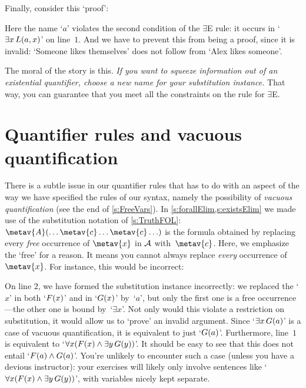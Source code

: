 Finally, consider this `proof':
\begin{fitchproof}
	\PR
	\open
		\AS
	\close
\ifHTMLtarget
\else
\fi
\end{fitchproof}
Here the name `$a$' violates the second condition of the $\exists$E
rule: it occurs in `$\exists x\, L(a, x)$' on line~$1$. And we
have to prevent this from being a proof, since it is invalid: `Someone
likes themselves' does not follow from `Alex likes someone'.

The moral of the story is this. \emph{If you want to squeeze information out of an existential quantifier, choose a new name for your substitution instance.} That way, you can guarantee that you meet all the constraints on the rule for $\exists$E.

\section{Quantifier rules and vacuous quantification}

There is a subtle issue in our quantifier rules that has to do with an
aspect of the way we have specified the rules of our syntax, namely
the possibility of \emph{vacuous quantification} (see the end of
\cref{s:FreeVars}). In \cref{s:forallElim,s:existsElim} we made use of
the substitution notation of \cref{s:TruthFOL}: $\metav{A}(\ldots
\metav{c} \ldots \metav{c} \ldots)$ is the formula obtained by
replacing every \emph{free} occurrence of $\metav{x}$ in $\mathcal{A}$
with~$\metav{c}$. Here, we emphasize the `free' for a reason. It means
you cannot always replace \emph{every} occurrence of~$\metav{x}$. For
instance, this would be incorrect:
\begin{fitchproof}
	\PR
	\ifHTMLtarget
\else
\fi
\end{fitchproof}
On line $2$, we have formed the substitution instance incorrectly: we
replaced the `$x$' in both `$F(x)$' and in `$G(x)$'
by~`$a$', but only the first one is a free occurrence---the other one
is bound by~`$\exists x$'. Not only would this violate a restriction
on substitution, it would allow us to `prove' an invalid argument.
Since `$\exists x\,G(a)$' is a case of vacuous quantification,
it is equivalent to just `$G(a)$'. Furthermore, line~$1$ is
equivalent to `$\forall x(F(x) \land \exists y\,G(y))$'.
It should be easy to see that this does not entail `$F(a) \land
G(a)$'. You're unlikely to encounter such a case (unless you
have a devious instructor): your exercises will likely only involve
sentences like `$\forall x(F(x) \land \exists
y\,G(y))$', with variables nicely kept separate.


